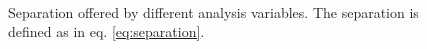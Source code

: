 \begin{figure}[htpb]
\begin{center}
\\
\caption{Separation offered by different analysis variables. The separation is defined as in eq. \ref{eq:separation}.}
\label{fig:ewk:separation}
\end{center}
\end{figure}


